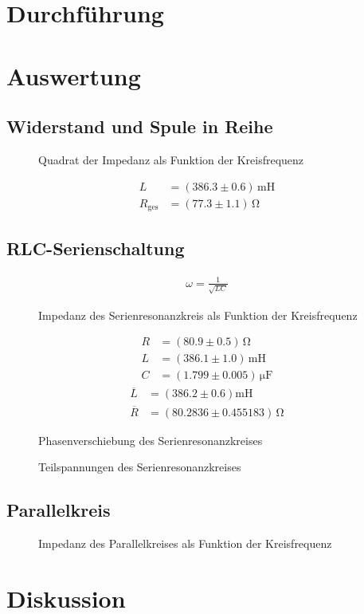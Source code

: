 \documentclass[12pt,a4paper,titlepage,headinclude,bibtotoc]{scrartcl}
\begin{document}
\section{Durchführung}
\label{sec:durchfuehrung}

\section{Auswertung}
\label{sec:auswertung}
\subsection{Widerstand und Spule in Reihe}
\begin{figure}[!htb]
	\centering
	
	\caption{Quadrat der Impedanz als Funktion der Kreisfrequenz}
	\label{fig:messung1}
\end{figure}

\begin{align}
	L&=(386.3\pm 0.6)\,\si{\milli\henry}\\
	R_\text{ges}&=(77.3 \pm 1.1)\,\si{\ohm}
\end{align}
\subsection{RLC-Serienschaltung}
\begin{align}
\omega=\frac{1}{\sqrt{LC}}
\end{align}
\begin{figure}[!htb]
	\centering
	
	\caption{Impedanz des Serienresonanzkreis als Funktion der Kreisfrequenz}
	\label{fig:messung2}
\end{figure}

\begin{align}
	R &= (80.9 \pm 0.5)\,\si{\ohm}\\
	L &= (386.1 \pm 1.0)\,\si{\milli\henry}\\
	C &= (1.799 \pm 0.005)\,\si{\micro\farad}
\end{align}
\begin{align}
\overline L&=(386.2 \pm 0.6)\si{\milli\henry}\\
\overline R&=(80.2836 \pm 0.455183)\,\si{\ohm}
\end{align}
\begin{figure}[!htb]
	\centering
	
	\caption{Phasenverschiebung des Serienresonanzkreises}
	\label{fig:phase}
\end{figure}

\begin{figure}[!htb]
	\centering
	
	\caption{Teilspannungen des Serienresonanzkreises}
	\label{fig:teilU}
\end{figure}
\subsection{Parallelkreis}
\begin{figure}[!htb]
	\centering
	
	\caption{Impedanz des Parallelkreises als Funktion der Kreisfrequenz}
	\label{fig:messung3}
\end{figure}

\section{Diskussion}
\label{sec:diskussion}



\end{document}
